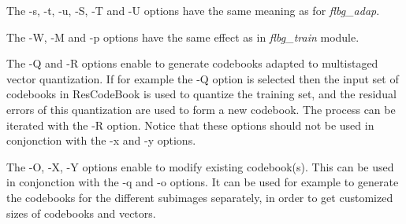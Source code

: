 The -s, -t, -u, -S, -T and -U options have the same meaning as for 
{\em flbg\_adap}. 

The -W, -M and -p options have the same effect as in {\em flbg\_train} 
module. 

The -Q and -R options enable to generate codebooks adapted to 
multistaged vector quantization. If for example the -Q option 
is selected then the input set of codebooks in ResCodeBook is used 
to quantize the training set, and the residual errors of this quantization 
are used to form a new codebook. The process can be iterated with the 
-R option. Notice that these options should not be used in conjonction with 
the -x and -y options. 

The -O, -X, -Y options enable to modify existing codebook(s). This can be used 
in conjonction with the -q and -o options. It can be used for example 
to generate the codebooks for the different subimages separately, 
in order to get customized sizes of codebooks and vectors. 
